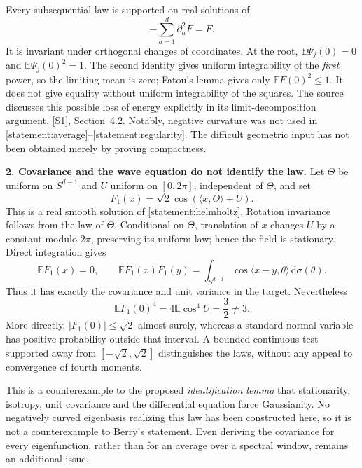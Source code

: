 \documentclass[11pt,a4paper]{article}
\newcommand{\E}{\mathbb{E}}
\newcommand{\dd}{\,\mathrm d}
\newcommand{\sref}[2]{\hyperlink{source:#1:#2}{[S#2]}}
\numberwithin{equation}{section}
\begin{document}
Every subsequential law is supported on real solutions of
\begin{equation}\label{statement:helmholtz}
 -\sum_{a=1}^d\partial_a^2F=F.
\end{equation}
It is invariant under orthogonal changes of coordinates. At the root,
$\E\Psi_j(0)=0$ and $\E\Psi_j(0)^2=1$. The second identity gives uniform
integrability of the \emph{first} power, so the limiting mean is zero;
Fatou's lemma gives only $\E F(0)^2\leq1$. It does not give equality
without uniform integrability of the squares. The source discusses this
possible loss of energy explicitly in its limit-decomposition argument.
\sref{statement}{1}, Section~4.2. Notably, negative curvature was not used in
\eqref{statement:average}--\eqref{statement:regularity}. The difficult geometric input
has not been obtained merely by proving compactness.

\textbf{2. Covariance and the wave equation do not identify the law.}
Let $\Theta$ be uniform on $S^{d-1}$ and $U$ uniform on $[0,2\pi]$,
independent of $\Theta$, and set
\begin{equation}\label{statement:onewave}
 F_1(x)=\sqrt2\cos(\langle x,\Theta\rangle+U).
\end{equation}
This is a real smooth solution of \eqref{statement:helmholtz}. Rotation
invariance follows from the law of $\Theta$. Conditional on $\Theta$,
translation of $x$ changes $U$ by a constant modulo $2\pi$, preserving its
uniform law; hence the field is stationary. Direct integration gives
\[
 \E F_1(x)=0,\qquad
 \E F_1(x)F_1(y)=\int_{S^{d-1}}
       \cos\langle x-y,\theta\rangle\dd\sigma(\theta).
\]
Thus it has exactly the covariance and unit variance in the target.
Nevertheless
\begin{equation}\label{statement:fourth}
 \E F_1(0)^4=4\E\cos^4U=\frac32\ne3.
\end{equation}
More directly, $|F_1(0)|\leq\sqrt2$ almost surely, whereas a standard
normal variable has positive probability outside that interval. A bounded
continuous test supported away from $[-\sqrt2,\sqrt2]$ distinguishes the
laws, without any appeal to convergence of fourth moments.

This is a counterexample to the proposed \emph{identification lemma}
that stationarity, isotropy, unit covariance and the differential equation
force Gaussianity. No negatively curved eigenbasis realizing this law has
been constructed here, so it is not a counterexample to Berry's statement.
Even deriving the covariance for every eigenfunction, rather than for an
average over a spectral window, remains an additional issue.
\end{document}
